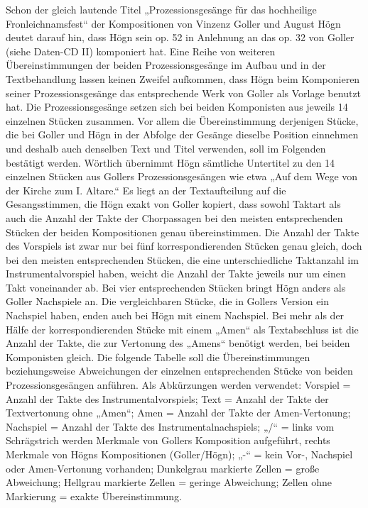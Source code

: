 Schon der gleich lautende Titel „Prozessionsgesänge für das hochheilige
Fronleichnamsfest“ der Kompositionen von Vinzenz Goller und August Högn
deutet darauf hin, dass Högn sein op. 52 in Anlehnung an das op. 32 von
Goller (siehe Daten-CD II) komponiert hat. Eine Reihe von weiteren
Übereinstimmungen der beiden Prozessionsgesänge im Aufbau und in der
Textbehandlung lassen keinen Zweifel aufkommen, dass Högn beim
Komponieren seiner Prozessionsgesänge das entsprechende Werk von Goller
als Vorlage benutzt hat. Die Prozessionsgesänge setzen sich bei beiden
Komponisten aus jeweils 14 einzelnen Stücken zusammen. Vor allem die
Übereinstimmung derjenigen Stücke, die bei Goller und Högn in der
Abfolge der Gesänge dieselbe Position einnehmen und deshalb auch
denselben Text und Titel verwenden, soll im Folgenden bestätigt werden.
Wörtlich übernimmt Högn sämtliche Untertitel zu den 14 einzelnen
Stücken aus Gollers Prozessionsgesängen wie etwa „Auf dem Wege von der
Kirche zum I. Altare.“ Es liegt an der Textaufteilung auf die
Gesangsstimmen, die Högn exakt von Goller kopiert, dass sowohl Taktart
als auch die Anzahl der Takte der Chorpassagen bei den meisten
entsprechenden Stücken der beiden Kompositionen genau übereinstimmen.
Die Anzahl der Takte des Vorspiels ist zwar nur bei fünf
korrespondierenden Stücken genau gleich, doch bei den meisten
entsprechenden Stücken, die eine unterschiedliche Taktanzahl im
Instrumentalvorspiel haben, weicht die Anzahl der Takte jeweils nur um
einen Takt voneinander ab. Bei vier entsprechenden Stücken bringt Högn
anders als Goller Nachspiele an. Die vergleichbaren Stücke, die in
Gollers Version ein Nachspiel haben, enden auch bei Högn mit einem
Nachspiel. Bei mehr als der Hälfe der korrespondierenden Stücke mit
einem „Amen“ als Textabschluss ist die Anzahl der Takte, die zur
Vertonung des „Amens“ benötigt werden, bei beiden Komponisten gleich.
Die folgende Tabelle soll die Übereinstimmungen beziehungsweise
Abweichungen der einzelnen entsprechenden Stücke von beiden
Prozessionsgesängen anführen. Als Abkürzungen werden verwendet:
Vorspiel = Anzahl der Takte des Instrumentalvorspiels; Text = Anzahl
der Takte der Textvertonung ohne „Amen“; Amen = Anzahl der Takte der
Amen-Vertonung; Nachspiel = Anzahl der Takte des
Instrumentalnachspiels; „/“ = links vom Schrägstrich werden Merkmale
von Gollers Komposition aufgeführt, rechts Merkmale von Högns
Kompositionen (Goller/Högn); „-“ = kein Vor-, Nachspiel oder
Amen-Vertonung vorhanden; Dunkelgrau markierte Zellen = große
Abweichung; Hellgrau markierte Zellen = geringe Abweichung; Zellen ohne
Markierung = exakte Übereinstimmung.

